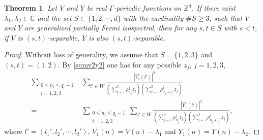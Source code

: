\documentclass[12pt,letterpaper]{amsart}
\newtheorem{theorem}{Theorem}[section]
\newcommand{\abs}[1]{\left\lvert #1 \right\rvert}
\def\C{{\mathbb C}}
\def\Z{{\mathbb Z}}
\begin{document}
{\begin{theorem}\label{thmferst}
Let $V$ and $Y$ be real $\Gamma$-periodic functions on $\Z^d$.  If there exist $\lambda_1,\lambda_2\in\C$  and the set $S\subset\{1,2,\cdots,d\}$ with the cardinality $\# S\geq 3$, such that $V$ and $Y$ are generalized partially Fermi isospectral,
then for any $s,t\in S$ with $s<t$, if $V$ is $(s,t)$-separable, $Y$ is also $(s,t)$-separable.
\end{theorem}}
\begin{proof}
Without loss of generality, we assume that $S=\{1,2,3\}$ and $(s,t)=(1,2)$.
By \eqref{sumv2y2} one has for any possible $z_j$, $j=1,2,3$,
\begin{align}
\sum_{\substack{0\leq n_i\leq q_i-1\\ i=1,2,3}}&\sum_{l'\in W}\frac{\abs{\hat{V_1}(l')}^2}{\left(\sum_{j=1}^3\rho^j_{n_j}z_j\right)\left(\sum_{j=1}^3\rho^j_{n_j+l_j'}z_j\right)}\nonumber\\
=&\sum_{\substack{0\leq n_i\leq q_i-1\\ i=1,2,3}}\sum_{l'\in W}\frac{\abs{\hat{Y_1}(l')}^2}{\left(\sum_{j=1}^3\rho^j_{n_j}z_j\right)\left(\sum_{j=1}^3\rho^j_{n_j+l_j'}z_j\right)},\label{midj123}
\end{align}
where $l'=(l_1',l_2',\cdots,l_d')$, $V_1(n)=V(n)-\lambda_1$ and $Y_1(n)=Y(n)-\lambda_2$.


\end{proof}
\end{document}

